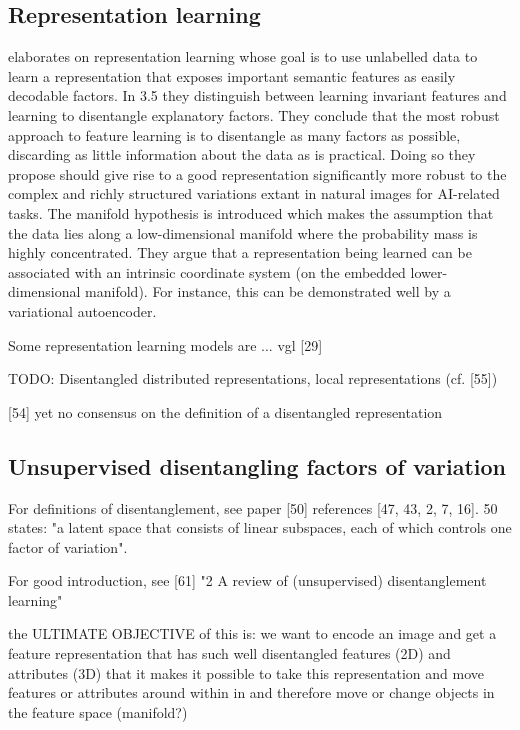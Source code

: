 \documentclass[12pt,a4paper]{article}
\begin{document}
\subsection{Representation learning}
\par\cite{1206.5538} elaborates on representation learning whose goal is to use unlabelled data to learn a representation that exposes important semantic features as easily decodable factors. In 3.5 they distinguish between learning invariant features and learning to disentangle explanatory factors. They conclude that the most robust approach to feature learning is to disentangle as many factors as possible, discarding as little information about the data as is practical. Doing so they propose should give rise to a good representation significantly more robust to the complex and richly structured variations extant in natural images for AI-related tasks. The manifold hypothesis is introduced which makes the assumption that the data lies along a low-dimensional manifold where the probability mass is highly concentrated. They argue that a representation being learned can be associated with an intrinsic coordinate system (on the embedded lower-dimensional manifold). For instance, this can be demonstrated well by a variational autoencoder.

Some representation learning models are ... vgl [29]

TODO: Disentangled distributed representations, local representations  (cf. [55])

[54] yet no consensus on the definition of a disentangled representation

\subsection{Unsupervised disentangling factors of variation}
For definitions of disentanglement, see paper [50] references [47, 43, 2, 7, 16]. 50 states: "a latent space that consists of linear subspaces, each of which controls one factor of variation".

\par For good introduction, see [61] "2 A review of (unsupervised) disentanglement learning"

\par the ULTIMATE OBJECTIVE of this is: we want to encode an image and get a feature representation that has such well disentangled features (2D) and attributes (3D) that it makes it possible to take this representation and move features or attributes around within in and therefore move or change objects in the feature space (manifold?)
\end{document}
